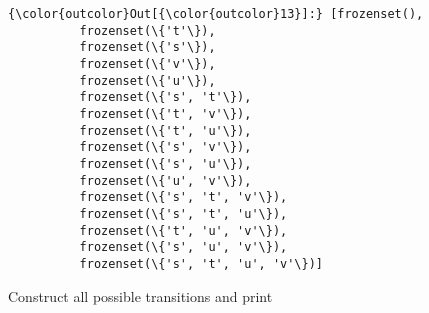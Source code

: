 \documentclass[11pt]{article}
\begin{document}
\begin{Verbatim}[commandchars=\\\{\}]
{\color{outcolor}Out[{\color{outcolor}13}]:} [frozenset(),
          frozenset(\{'t'\}),
          frozenset(\{'s'\}),
          frozenset(\{'v'\}),
          frozenset(\{'u'\}),
          frozenset(\{'s', 't'\}),
          frozenset(\{'t', 'v'\}),
          frozenset(\{'t', 'u'\}),
          frozenset(\{'s', 'v'\}),
          frozenset(\{'s', 'u'\}),
          frozenset(\{'u', 'v'\}),
          frozenset(\{'s', 't', 'v'\}),
          frozenset(\{'s', 't', 'u'\}),
          frozenset(\{'t', 'u', 'v'\}),
          frozenset(\{'s', 'u', 'v'\}),
          frozenset(\{'s', 't', 'u', 'v'\})]
\end{Verbatim}
            
    Construct all possible transitions and print
\end{document}
